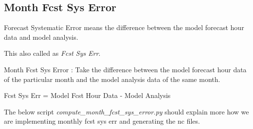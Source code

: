 \documentclass[letterpaper,10pt,english]{sphinxmanual}
\begin{document}
\subsection{Month Fcst Sys Error}
\label{diagnosis:month-fcst-sys-error}
Forecast Systematic Error means the difference between the model forecast hour data and model analysis.

This also called as \emph{Fcst Sys Err}.

Month Fcst Sys Error : Take the difference between the model forecast hour data of the particular month and the model analysis data of the same month.

Fcst Sys Err = Model Fcst Hour Data - Model Analysis

The below script \emph{compute\_month\_fcst\_sys\_error.py} should explain more how we are implementing monthly fcst sys err and generating the nc files.
\label{diagnosis:module-compute_month_fcst_sys_error}\label{diagnosis:module-compute_month_fcst_sys_error.py}
\end{document}
